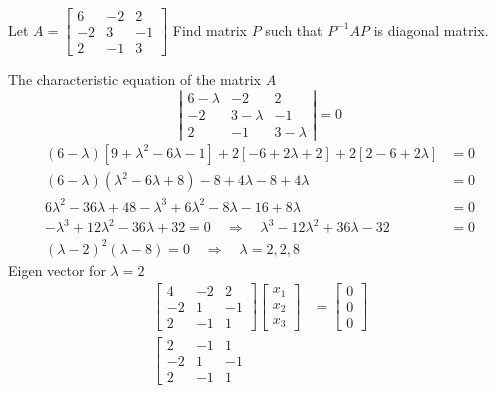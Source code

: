 \begin{exercise}
	Let $A=\left[\begin{array}{rrr}6 & -2 & 2 \\ -2 & 3 & -1 \\ 2 & -1 & 3\end{array}\right]$ Find matrix $P$ such that $P^{-1} A P$ is diagonal matrix.\end{exercise}
\begin{answer}
The characteristic equation of the  matrix $A$\\
$$\left|\begin{array}{rrr}6-\lambda & -2 & 2 \\ -2 & 3-\lambda & -1 \\ 2 & -1 & 3-\lambda\end{array}\right|=0$$
\begin{align*}
	(6-\lambda)\left[9+\lambda^{2}-6 \lambda-1\right]+2[-6+2 \lambda+2]+2[2-6+2 \lambda]&=0 \\(6-\lambda)\left(\lambda^{2}-6 \lambda+8\right)-8+4 \lambda-8+4 \lambda&=0 \\
	6 \lambda^{2}-36 \lambda+48-\lambda^{3}+6 \lambda^{2}-8 \lambda-16+8 \lambda&=0 \\-\lambda^{3}+12 \lambda^{2}-36 \lambda+32=0 \quad \Rightarrow \quad \lambda^{3}-12 \lambda^{2}+36 \lambda-32&=0 \\
	(\lambda-2)^{2}(\lambda-8)=0 \quad \Rightarrow \quad \lambda=2,2,8
\end{align*}
Eigen vector for $\lambda=2$\\
\begin{align*}
	\left[\begin{array}{ccc}
		4 & -2 & 2 \\
		-2 & 1 & -1 \\
		2 & -1 & 1
	\end{array}\right]\left[\begin{array}{l}
		x_{1} \\
		x_{2} \\
		x_{3}
	\end{array}\right]&=\left[\begin{array}{l}
		0 \\
		0 \\
		0
	\end{array}\right]\\\left[\begin{array}{rrr}
		2 & -1 & 1 \\
		-2 & 1 & -1 \\
		2 & -1 & 1

\end{array}
\end{align*}
\end{answer}
